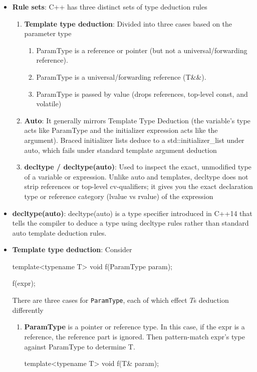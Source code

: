 \documentclass{report}
\begin{document}
    \pagebreak 
    \begin{itemize}
        \item \textbf{Rule sets}: C++ has three distinct sets of type deduction rules
            \begin{enumerate}
                \item \textbf{Template type deduction}: Divided into three cases based on the parameter type
                    \begin{enumerate}
                        \item ParamType is a reference or pointer (but not a universal/forwarding reference).
                        \item ParamType is a universal/forwarding reference (T\&\&).
                        \item ParamType is passed by value (drops references, top-level const, and volatile)
                    \end{enumerate}
                \item \textbf{Auto}: It generally mirrors Template Type Deduction (the variable's type acts like ParamType and the initializer expression acts like the argument).
                    \bigbreak \noindent 
                    Braced initializer lists deduce to a std::initializer\_list under auto, which fails under standard template argument deduction
                \item \textbf{decltype / decltype(auto)}: Used to inspect the exact, unmodified type of a variable or expression.
                    \bigbreak \noindent 
                    Unlike auto and templates, decltype does not strip references or top-level cv-qualifiers; it gives you the exact declaration type or reference category (lvalue vs rvalue) of the expression
            \end{enumerate}
        \item \textbf{decltype(auto)}: decltype(auto) is a type specifier introduced in C++14 that tells the compiler to deduce a type using decltype rules rather than standard auto template deduction rules.
        \item \textbf{Template type deduction}: Consider
            \bigbreak \noindent 
            \begin{cppcode}
            template<typename T>
            void f(ParamType param);

            f(expr);
            \end{cppcode}
            \bigbreak \noindent 
            There are three cases for \texttt{ParamType}, each of which effect $T$s deduction differently
            \begin{enumerate}
                \item \textbf{ParamType} is a pointer or reference type. In this case, if the expr is a reference, the reference part is ignored. Then pattern-match expr’s type against ParamType to determine T.
                    \bigbreak \noindent 
                    \begin{cppcode}
                    template<typename T>
                    void f(T& param);


\end{cppcode}
\end{enumerate}
\end{itemize}
\end{document}
